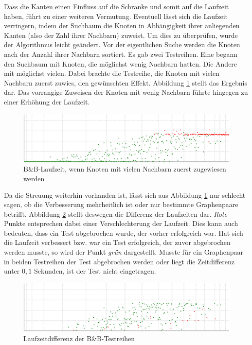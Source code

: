 Dass die Kanten einen Einfluss auf die Schranke und somit auf die Laufzeit haben, 
führt zu einer weiteren Vermutung. Eventuell lässt sich die Laufzeit verringern, indem 
der Suchbaum die Knoten in Abhängigkeit ihrer anliegenden Kanten (also der Zahl ihrer 
Nachbarn) zuweist. Um dies zu überprüfen, wurde der Algorithmus leicht geändert. Vor 
der eigentlichen Suche werden die Knoten nach der Anzahl ihrer Nachbarn sortiert. Es gab zwei 
Testreihen. Eine begann den Suchbaum mit Knoten, die möglichst wenig Nachbarn hatten. 
Die Andere mit möglichst vielen. Dabei brachte die Testreihe, die Knoten mit vielen 
Nachbarn zuerst zuwies, den gewünschten Effekt. Abbildung \ref{pic:BB_Nh} stellt das 
Ergebnis dar. Das vorrangige Zuweisen der Knoten mit wenig Nachbarn führte hingegen 
zu einer Erhöhung der Laufzeit. 

\begin{figure}[htb]
\centering
\noindent\includegraphics[width=\linewidth,height=\textheight,
keepaspectratio]{bilder/BB_Nh}
\caption{B\&B-Laufzeit, wenn Knoten mit vielen Nachbarn zuerst zugewiesen werden}
\label{pic:BB_Nh}
\end{figure}

Da die Streuung weiterhin vorhanden ist, lässt sich aus Abbildung \ref{pic:BB_Nh} nur 
schlecht sagen, ob die Verbesserung mehrheitlich ist oder nur bestimmte Graphenpaare 
betrifft. Abbildung \ref{pic:BBdif} stellt deswegen die Differenz der Laufzeiten dar. 
\emph{Rote} Punkte entsprechen dabei einer Verschlechterung der Laufzeit. Dies kann auch 
bedeuten, dass ein Test abgebrochen wurde, der vorher erfolgreich war. Hat sich die 
Laufzeit verbessert bzw. war ein Test erfolgreich, der zuvor abgebrochen werden musste, 
so wird der Punkt \emph{grün} dargestellt. 
Musste für ein Graphenpaar in beiden Testreihen der Test abgebrochen werden oder liegt 
die Zeitdifferenz unter $0{,}1$ Sekunden, ist der Test nicht eingetragen. 

\begin{figure}[htb]
\centering
\noindent\includegraphics[width=\linewidth,height=\textheight,
keepaspectratio]{bilder/BBdif}
\caption{Laufzeitdifferenz der B\&B-Testreihen}
\label{pic:BBdif}
\end{figure}

